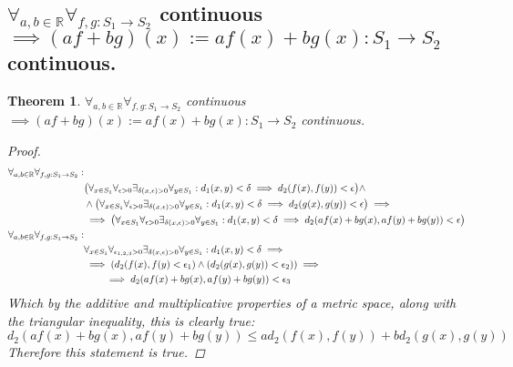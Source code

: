\documentclass[]{article}
\newcommand{\R}{\mathbb{R}}
\newtheorem{theorem}{Theorem}
\begin{document}
\subsection{$\forall_{a,b\in\R} \forall_{f,g : S_1 \to S_2}$ continuous $\implies (a f + b g) (x) := a f(x) + b g(x) : S_1 \to S_2$ continuous.}
\begin{theorem}
    $\forall_{a,b\in\R} \forall_{f,g : S_1 \to S_2}$ continuous $\implies (a f + b g) (x) := a f(x) + b g(x) : S_1 \to S_2$ continuous.
    \begin{proof}
        \begin{align*}
            \forall_{a,b\in\R} \forall_{f,g : S_1 \to S_2} : &\\
                &\qty(\forall_{x\in S_1} \forall_{\epsilon>0} \exists_{\delta(x,\epsilon)>0} \forall_{y\in S_1} : d_1(x,y) < \delta \implies d_2(f(x),f(y)) < \epsilon) \land\\
                &\land \qty(\forall_{x\in S_1} \forall_{\epsilon>0} \exists_{\delta(x,\epsilon)>0} \forall_{y\in S_1} : d_1(x,y) < \delta \implies d_2(g(x),g(y)) < \epsilon) \implies\\
                &\implies \qty(\forall_{x\in S_1} \forall_{\epsilon>0} \exists_{\delta(x,\epsilon)>0} \forall_{y\in S_1} : d_1(x,y) < \delta \implies d_2(a f(x) + b g(x),a f(y) + b g(y)) < \epsilon)\\
            \forall_{a,b\in\R} \forall_{f,g : S_1 \to S_2} : &\\
                &\forall_{x\in S_1} \forall_{\epsilon_{1,2,3}>0} \exists_{\delta(x,\epsilon)>0} \forall_{y\in S_1} : d_1(x,y) < \delta \implies\\
                &\implies \qty(d_2(f(x),f(y) < \epsilon_1) \land \qty(d_2(g(x),g(y)) < \epsilon_2)) \implies\\
                    &\qquad \implies d_2(a f(x) + b g(x),a f(y) + b g(y)) < \epsilon_3
        \end{align*}
        Which by the additive and multiplicative properties of a metric space, along with the triangular inequality, this is clearly true:
        $$d_2(a f(x) + b g(x), a f(y) + b g(y)) \leq a d_2(f(x),f(y)) + b d_2(g(x),g(y))$$
        Therefore this statement is true.
    \end{proof}
\end{theorem}

\end{document}
